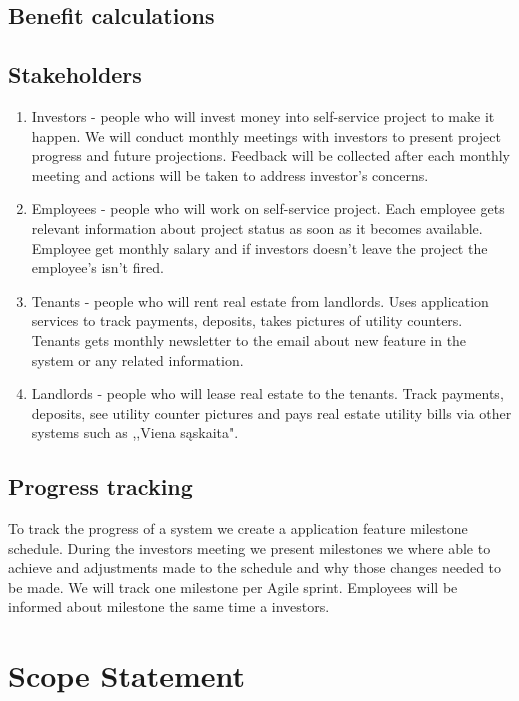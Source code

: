 \documentclass{VUMIFPSkursinis}
\begin{document}
	\subsection{Benefit calculations}

	\subsection{Stakeholders}
		\begin{enumerate}
			\item{Investors - people who will invest money into self-service project to make it happen. 
				We will conduct monthly meetings with investors to present project progress and future projections.
				Feedback will be collected after each monthly meeting and actions will be taken to address investor's concerns.}
			\item{Employees - people who will work on self-service project.
				Each employee gets relevant information about project status as soon as it becomes available.
				Employee get monthly salary and if investors doesn't leave the project the employee's isn't fired.}
			\item{Tenants - people who will rent real estate from landlords.
					Uses application services to track payments, deposits, takes pictures of utility counters.
					Tenants gets monthly newsletter to the email about new feature in the system or any related information.}
			\item{Landlords - people who will lease real estate to the tenants.
					Track payments, deposits, see utility counter pictures and pays real estate utility bills via other systems such as ,,Viena sąskaita".}
		\end{enumerate}

	\subsection{Progress tracking}
		To track the progress of a system we create a application feature milestone schedule.
		During the investors meeting we present milestones we where able to achieve and adjustments made to the schedule and why those changes needed to be made.
		We will track one milestone per Agile sprint.
		Employees will be informed about milestone the same time a investors.


\section{Scope Statement}
\end{document}
